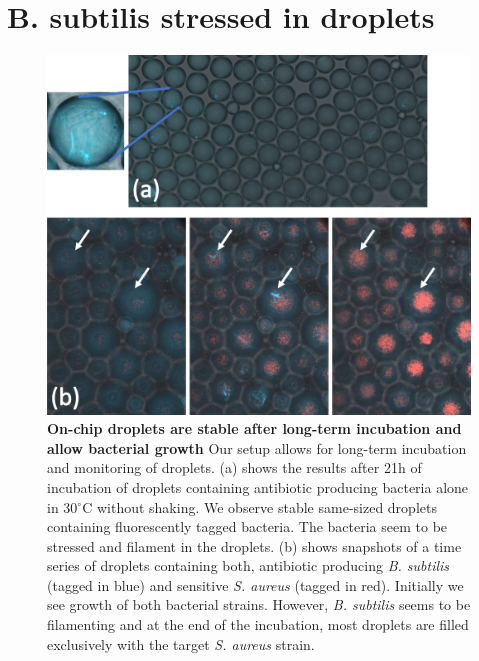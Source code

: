 \section{B. subtilis stressed in droplets}
\begin{figure}
\centering
\includegraphics[width=\linewidth]{graphics/2025_09_30_droplets_fig8.png}
\caption{\textbf{On-chip droplets are stable after long-term incubation and allow bacterial growth} Our setup allows for long-term incubation and monitoring of droplets. (a) shows the results after 21h of incubation of droplets containing antibiotic producing bacteria alone in 30$^\circ$C without shaking. We observe stable same-sized droplets containing fluorescently tagged bacteria. The bacteria seem to be stressed and filament in the droplets. (b) shows snapshots of a time series of droplets containing both, antibiotic producing \textit{B. subtilis} (tagged in blue) and sensitive \textit{S. aureus} (tagged in red). Initially we see growth of both bacterial strains. However, \textit{B. subtilis} seems to be filamenting and at the end of the incubation, most droplets are filled exclusively with the target \textit{S. aureus} strain.}
\label{fig:results_incubation_subtilis}
\end{figure}
